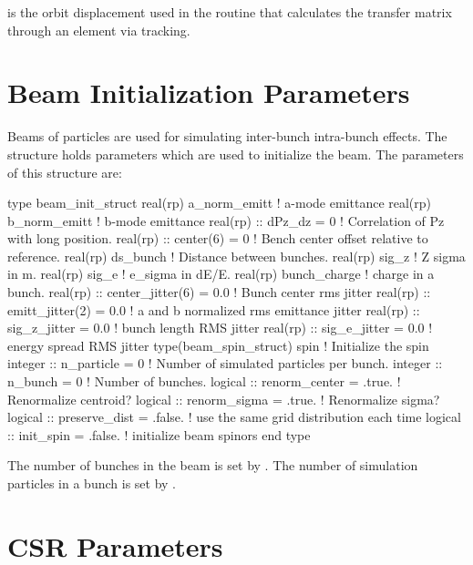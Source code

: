  is the orbit displacement used in the routine that
calculates the transfer matrix through an element via tracking.

\section{Beam Initialization Parameters}
\label{s:beam.init}

Beams of particles are used for simulating inter-bunch intra-bunch effects.
The  structure holds parameters which are used to initialize
the beam. The parameters of this structure are:
\begin{example}
  type beam_init_struct
    real(rp) a_norm_emitt     ! a-mode emittance
    real(rp) b_norm_emitt     ! b-mode emittance
    real(rp) :: dPz_dz = 0    ! Correlation of Pz with long position.
    real(rp) :: center(6) = 0 ! Bench center offset relative to reference.
    real(rp) ds_bunch         ! Distance between bunches.
    real(rp) sig_z            ! Z sigma in m.
    real(rp) sig_e            ! e_sigma in dE/E.
    real(rp) bunch_charge     ! charge in a bunch.
    real(rp) :: center_jitter(6) = 0.0 ! Bunch center rms jitter
    real(rp) :: emitt_jitter(2)  = 0.0 ! a and b normalized rms emittance jitter
    real(rp) :: sig_z_jitter     = 0.0 ! bunch length RMS jitter 
    real(rp) :: sig_e_jitter     = 0.0 ! energy spread RMS jitter 
    type(beam_spin_struct)  spin       ! Initialize the spin
    integer :: n_particle = 0          ! Number of simulated particles per bunch.
    integer :: n_bunch = 0             ! Number of bunches.
    logical :: renorm_center = .true.  ! Renormalize centroid?
    logical :: renorm_sigma = .true.   ! Renormalize sigma?
    logical :: preserve_dist = .false. ! use the same grid distribution each time
    logical :: init_spin     = .false. ! initialize beam spinors
  end type
\end{example}
The number of bunches in the beam is set by . 
The number of simulation particles in a bunch is set by .


\section{CSR Parameters}
\label{s:csr.params}

